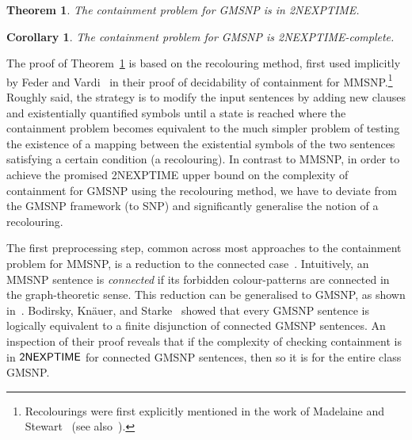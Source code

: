 \documentclass[oneside,reqno,12pt]{amsart}
\theoremstyle{plain}
\newtheorem{theorem}[thm]{Theorem}
\newtheorem{corollary}[thm]{Corollary}
\theoremstyle{remark}
\newcommand{\TWONEXPTIME}{{\textup{\textsf{2NEXPTIME}}}\xspace}
\begin{document}
\begin{theorem}\label{thm:2NEXPTIME_for_GMSNP} The containment problem for GMSNP is in \TWONEXPTIME.
\end{theorem}
\begin{corollary}
    The containment problem for GMSNP is \TWONEXPTIME-complete.
\end{corollary}
The proof of Theorem~\ref{thm:2NEXPTIME_for_GMSNP} is based on the recolouring method, first used implicitly by Feder and Vardi~\cite[Theorem~7]{federvardi1998} in their proof of decidability of containment for MMSNP.\footnote{Recolourings were first explicitly mentioned in the work of Madelaine and Stewart~\cite{madelaine2007constraint} (see also~\cite{madelaine2010containment}).}
Roughly said, the strategy is to modify the input sentences by adding new clauses and existentially quantified symbols until a state is reached where the containment problem becomes equivalent to the much simpler problem of testing the existence of a mapping between the existential symbols of the two sentences satisfying a certain condition (a recolouring).
In contrast to MMSNP, in order to achieve the promised \TWONEXPTIME upper bound on the complexity of containment for GMSNP using the recolouring method, we have to deviate from the GMSNP framework (to SNP) and significantly generalise the notion of a recolouring.


The first preprocessing step, common across most approaches to the containment problem for MMSNP, is a reduction to the connected case~\cite{bodirsky2018_article,bouhris_lutz2016,federvardi1998,madelaine2010containment}.
Intuitively, an MMSNP sentence is \emph{connected} if its forbidden colour-patterns are connected in the graph-theoretic sense.
This reduction can be generalised to GMSNP, as shown in~\cite{bodirsky_asnp}.  
Bodirsky, Kn\"{a}uer, and Starke~\cite[Proposition~1]{bodirsky_asnp} showed that every GMSNP sentence is logically equivalent to a finite disjunction of connected GMSNP sentences. 
An inspection of their proof reveals that if the complexity of checking containment is in $\TWONEXPTIME$ for connected GMSNP sentences, then so it is for the entire class GMSNP.
\end{document}
